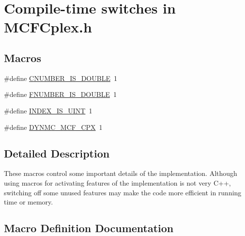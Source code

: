 \hypertarget{group___m_c_f_c_p_l_e_x___m_a_c_r_o_s}{}\section{Compile-\/time switches in M\+C\+F\+Cplex.\+h}
\label{group___m_c_f_c_p_l_e_x___m_a_c_r_o_s}
\subsection*{Macros}
\begin{DoxyCompactItemize}
\item 
\#define \mbox{\hyperlink{group___m_c_f_c_p_l_e_x___m_a_c_r_o_s_ga14939689b27f47bbe8fae89b34297b78}{C\+N\+U\+M\+B\+E\+R\+\_\+\+I\+S\+\_\+\+D\+O\+U\+B\+LE}}~1
\item 
\#define \mbox{\hyperlink{group___m_c_f_c_p_l_e_x___m_a_c_r_o_s_ga8d69259915b94276655a8693f449afd9}{F\+N\+U\+M\+B\+E\+R\+\_\+\+I\+S\+\_\+\+D\+O\+U\+B\+LE}}~1
\item 
\#define \mbox{\hyperlink{group___m_c_f_c_p_l_e_x___m_a_c_r_o_s_ga2924698660243e1c7a896b4c08f08823}{I\+N\+D\+E\+X\+\_\+\+I\+S\+\_\+\+U\+I\+NT}}~1
\item 
\#define \mbox{\hyperlink{group___m_c_f_c_p_l_e_x___m_a_c_r_o_s_gaec7c2e23803c5fa391ff6b13ecac23b6}{D\+Y\+N\+M\+C\+\_\+\+M\+C\+F\+\_\+\+C\+PX}}~1
\end{DoxyCompactItemize}


\subsection{Detailed Description}
These macros control some important details of the implementation. Although using macros for activating features of the implementation is not very C++, switching off some unused features may make the code more efficient in running time or memory. 

\subsection{Macro Definition Documentation}
\mbox{\label{group___m_c_f_c_p_l_e_x___m_a_c_r_o_s_ga14939689b27f47bbe8fae89b34297b78}} 
